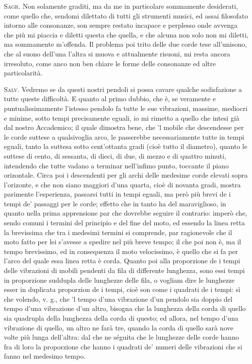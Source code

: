 \documentclass[11pt,twoside,openany]{book}
\newcommand{\speaker}[1]{\textcolor{rubric}{\textsc{#1}}\space}
\begin{document}
\speaker{Sagr.} Non solamente graditi, ma da me in particolare sommamente desiderati, come quello che, sendomi dilettato di tutti gli strumenti musici, ed assai filosofato intorno alle consonanze, son sempre restato incapace e perplesso onde avvenga che più mi piaccia e diletti questa che quella, e che alcuna non solo non mi diletti, ma sommamente m'offenda. Il problema poi trito delle due corde tese all'unisono, che al suono dell'una l'altra si muova e attualmente risuoni, mi resta ancora irresoluto, come anco non ben chiare le forme delle consonanze ed altre particolarità.

\speaker{Salv.} Vedremo se da questi nostri pendoli si possa cavare qualche sodisfazione a tutte queste difficoltà. E quanto al primo dubbio, che è, se veramente e puntualissimamente l'istesso pendolo fa tutte le sue vibrazioni, massime, mediocri e minime, sotto tempi precisamente eguali, io mi rimetto a quello che intesi già dal nostro Accademico; il quale dimostra bene, che 'l mobile che descendesse per le corde suttese a qualsivoglia arco, le passerebbe necessariamente tutte in tempi eguali, tanto la suttesa sotto cent'ottanta gradi (cioè tutto il diametro), quanto le suttese di cento, di sessanta, di dieci, di due, di mezzo e di quattro minuti, intendendo che tutte vadano a terminar nell'infimo punto, toccante il piano orizontale. Circa poi i descendenti per gli archi delle medesime corde elevati sopra l'orizonte, e che non siano maggiori d'una quarta, cioè di novanta gradi, mostra parimente l'esperienza, passarsi tutti in tempi eguali, ma però più brevi de i tempi de' passaggi per le corde; effetto che in tanto ha del maraviglioso, in quanto nella prima apprensione par che dovrebbe seguire il contrario: imperò che, sendo comuni i termini del principio e del fine del moto, ed essendo la linea retta la brevissima che tra i medesimi termini si comprende, par ragionevole che il moto fatto per lei s'avesse a spedire nel più breve tempo; il che poi non è, ma il tempo brevissimo, ed in consequenza il moto velocissimo, è quello che si fa per l'arco del quale essa linea retta è corda. Quanto poi alla proporzione de i tempi delle vibrazioni di mobili pendenti da fila di differente lunghezza, sono essi tempi in proporzione suddupla delle lunghezze delle fila, o vogliam dire le lunghezze esser in duplicata proporzion de i tempi, cioè son come i quadrati de i tempi: sì che volendo, v. g., che 'l tempo d'una vibrazione d'un pendolo sia doppio del tempo d'una vibrazione d'un altro, bisogna che la lunghezza della corda di quello sia quadrupla della lunghezza della corda di questo; ed allora, nel tempo d'una vibrazione di quello, un altro ne farà tre, quando la corda di quello sarà nove volte più lunga dell'altra: dal che ne séguita che le lunghezze delle corde hanno fra di loro la proporzione che hanno i quadrati de' numeri delle vibrazioni che si fanno nel medesimo tempo.
\end{document}

